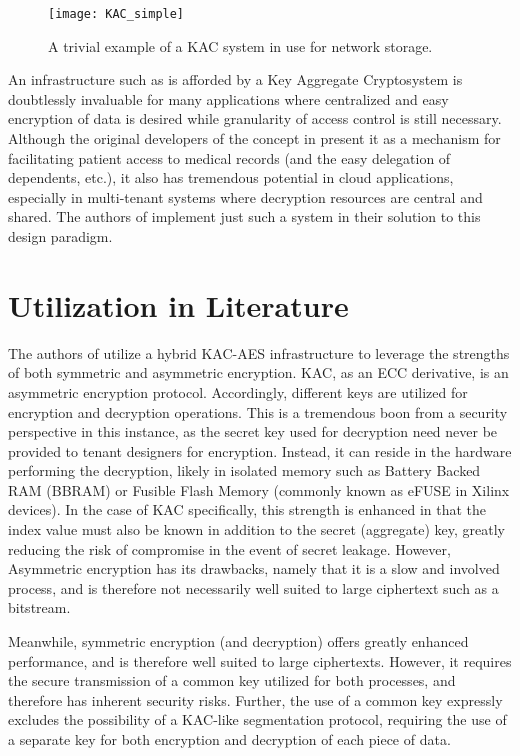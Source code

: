 \begin{figure}[ht]
    \centering
    \texttt{[image: KAC\_simple]}
    \caption[KAC Example]{A trivial example of a KAC system in use for network storage. \cite{chu_key-aggregate_2014}}
    \label{fig:KAC_simple}
\end{figure}

An infrastructure such as is afforded by a Key Aggregate Cryptosystem is doubtlessly invaluable for many applications where centralized and easy encryption of data is desired while granularity of access control is still necessary. Although the original developers of the concept in \cite{chu_key-aggregate_2014} present it as a mechanism for facilitating patient access to medical records (and the easy delegation of dependents, etc.), it also has tremendous potential in cloud applications, especially in multi-tenant systems where decryption resources are central and shared. The authors of \cite{bag_cryptographically_2020} implement just such a system in their solution to this design paradigm.

\section{Utilization in Literature}\label{sec:KACLiterature}
The authors of \cite{bag_cryptographically_2020} utilize a hybrid KAC-AES infrastructure to leverage the strengths of both symmetric and asymmetric encryption. KAC, as an ECC derivative, is an asymmetric encryption protocol. Accordingly, different keys are utilized for encryption and decryption operations. This is a tremendous boon from a security perspective in this instance, as the secret key used for decryption need never be provided to tenant designers for encryption. Instead, it can reside in the hardware performing the decryption, likely in isolated memory such as Battery Backed RAM (BBRAM) or Fusible Flash Memory (commonly known as eFUSE in Xilinx devices). In the case of KAC specifically, this strength is enhanced in that the index value must also be known in addition to the secret (aggregate) key, greatly reducing the risk of compromise in the event of secret leakage. However, Asymmetric encryption has its drawbacks, namely that it is a slow and involved process, and is therefore not necessarily well suited to large ciphertext such as a bitstream.

Meanwhile, symmetric encryption (and decryption) offers greatly enhanced performance, and is therefore well suited to large ciphertexts. However, it requires the secure transmission of a common key utilized for both processes, and therefore has inherent security risks. Further, the use of a common key expressly excludes the possibility of a KAC-like segmentation protocol, requiring the use of a separate key for both encryption and decryption of each piece of data.

